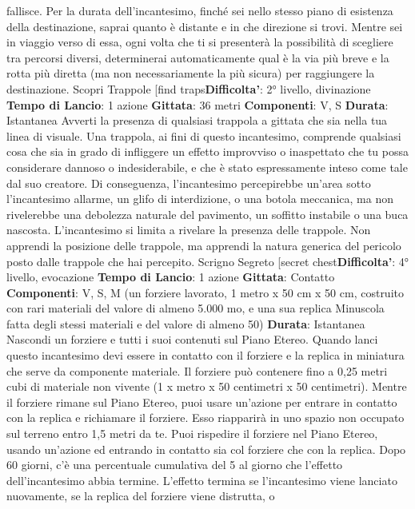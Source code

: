 \begin{multicols}{2}
fallisce.
Per la durata dell’incantesimo, finché sei nello stesso
piano di esistenza della destinazione, saprai quanto è
distante e in che direzione si trovi. Mentre sei in viaggio
verso di essa, ogni volta che ti si presenterà la
possibilità di scegliere tra percorsi diversi, determinerai
automaticamente qual è la via più breve e la rotta più
diretta (ma non necessariamente la più sicura) per
raggiungere la destinazione.
Scopri Trappole
[find traps\textbf{Difficolta'}:
2° livello, divinazione
\textbf{Tempo di Lancio}: 1 azione
\textbf{Gittata}: 36 metri
\textbf{Componenti}: V, S
\textbf{Durata}: Istantanea
Avverti la presenza di qualsiasi trappola a gittata che
sia nella tua linea di visuale. Una trappola, ai fini di
questo incantesimo, comprende qualsiasi cosa che sia
in grado di infliggere un effetto improvviso o inaspettato
che tu possa considerare dannoso o indesiderabile, e
che è stato espressamente inteso come tale dal suo
creatore. Di conseguenza, l’incantesimo percepirebbe
un’area sotto l’incantesimo allarme, un glifo di
interdizione, o una botola meccanica, ma non
rivelerebbe una debolezza naturale del pavimento, un
soffitto instabile o una buca nascosta.
L’incantesimo si limita a rivelare la presenza delle
trappole. Non apprendi la posizione delle trappole, ma
apprendi la natura generica del pericolo posto dalle
trappole che hai percepito.
Scrigno Segreto
[secret chest\textbf{Difficolta'}:
4° livello, evocazione
\textbf{Tempo di Lancio}: 1 azione
\textbf{Gittata}: Contatto
\textbf{Componenti}: V, S, M (un forziere lavorato, 1 metro x
50 cm x 50 cm, costruito con rari materiali del valore di
almeno 5.000 mo, e una sua replica Minuscola fatta
degli stessi materiali e del valore di almeno 50)
\textbf{Durata}: Istantanea
Nascondi un forziere e tutti i suoi contenuti sul Piano
Etereo. Quando lanci questo incantesimo devi essere in
contatto con il forziere e la replica in miniatura che
serve da componente materiale. Il forziere può
contenere fino a 0,25 metri cubi di materiale non
vivente (1 x metro x 50 centimetri x 50 centimetri).
Mentre il forziere rimane sul Piano Etereo, puoi usare
un’azione per entrare in contatto con la replica e
richiamare il forziere. Esso riapparirà in uno spazio non
occupato sul terreno entro 1,5 metri da te. Puoi
rispedire il forziere nel Piano Etereo, usando un’azione
ed entrando in contatto sia col forziere che con la
replica.
Dopo 60 giorni, c’è una percentuale cumulativa del 5%
al giorno che l’effetto dell’incantesimo abbia termine.
L’effetto termina se l’incantesimo viene lanciato
nuovamente, se la replica del forziere viene distrutta, o

\end{multicols}

